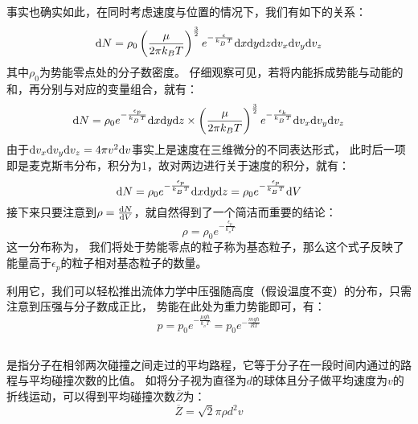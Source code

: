             事实也确实如此，在同时考虑速度与位置的情况下，我们有如下的关系：
            \begin{equation}
                \mathrm{d}{N}=\rho_{0}\left(\frac \mu{2\pi k_{B}T}\right)^{\frac{3}{2}}e^{-\frac{\epsilon}{k_{_B}T}}
                \mathrm{d}{x}\mathrm{d}{y}\mathrm{d}{z}\mathrm{d}{v_{x}}\mathrm{d}{v_{y}}\mathrm{d}{v_{z}}
                \nonumber
            \end{equation}
            其中$\rho_{0}$为势能零点处的分子数密度。
            仔细观察可见，若将内能拆成势能与动能的和，再分别与对应的变量组合，就有：
            \begin{equation}
                \mathrm{d}{N} =\rho_{0}e^{-\frac{\epsilon_{p}}{k_{_B}T}}\mathrm{d}{x}\mathrm{d}{y}\mathrm{d}{z}\times\left(\frac \mu{2\pi k_{B}T}\right)^{\frac{3}{2}}e^{-\frac{\epsilon_{k}}{k_{_B}T}}
                \mathrm{d}{v_{x}}\mathrm{d}{v_{y}}\mathrm{d}{v_{z}}
                \nonumber
            \end{equation}
            由于$\mathrm{d}{v_{x}}\mathrm{d}{v_{y}}\mathrm{d}{v_{z}}=4\pi v^{2}\mathrm{d}{v}$事实上是速度在三维微分的不同表达形式，
            此时后一项即是麦克斯韦分布，积分为1，故对两边进行关于速度的积分，就有：
            \begin{equation}
                \mathrm{d}{N} =\rho_{0}e^{-\frac{\epsilon_{p}}{k_{_B}T}}\mathrm{d}{x}\mathrm{d}{y}\mathrm{d}{z} =\rho_{0}e^{-\frac{\epsilon_{p}}{k_{_B}T}}\mathrm{d}{V}
                \nonumber
            \end{equation}
            接下来只要注意到$\rho = \frac{\mathrm{d}{N}}{\mathrm{d}{V}}$，就自然得到了一个简洁而重要的结论：
            \begin{equation}
                \rho = \rho_{0}e^{-\frac{\epsilon_{p}}{k_{_B}T}}
                \nonumber
            \end{equation}
            这一分布称为，
            我们将处于势能零点的粒子称为基态粒子，那么这个式子反映了能量高于$\epsilon_{p}$的粒子相对基态粒子的数量。
            
            利用它，我们可以轻松推出流体力学中压强随高度（假设温度不变）的分布，只需注意到压强与分子数成正比，
            势能在此处为重力势能即可，有：
            \begin{equation}
                p = p_{0}e^{-\frac{\mu gh}{k_{_B}T}} = p_{0}e^{-\frac{mgh}{RT}}
                \nonumber    
            \end{equation}
        \subsection[平均自由程]{}
            是指分子在相邻两次碰撞之间走过的平均路程，它等于分子在一段时间内通过的路程与平均碰撞次数的比值。
            如将分子视为直径为$d$的球体且分子做平均速度为$v$的折线运动，可以得到平均碰撞次数$\overline{Z}$为：
            \begin{equation}
                \overline{Z} = \sqrt{2}\pi \rho d^{2} v
                \nonumber
            \end{equation}

